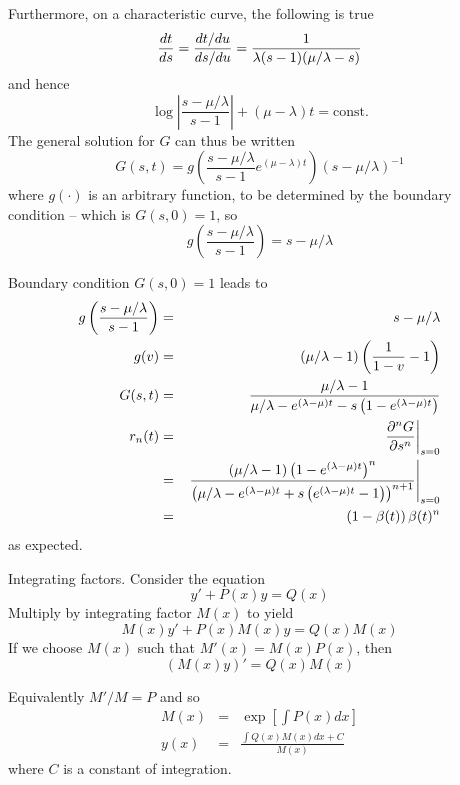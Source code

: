 \documentclass{beamer}
\begin{document}
\begin{frame}{}
Furthermore, on a characteristic curve, the following is true
\[
\frac{d {t}}{d {s}} = \frac{dt/du}{ds/du} = \frac{1}{\lambda(s-1)(\mu/\lambda - s)}
\]
and hence
\[
\log \left| \frac{s - \mu / \lambda}{s - 1} \right| + (\mu - \lambda) t = \mbox{const.}
\]
The general solution for $G$ can thus be written
\[
G(s,t) = g \left( \frac{s - \mu / \lambda}{s - 1} e^{(\mu - \lambda) t} \right) (s - \mu / \lambda)^{-1}
\]
where $g(\cdot)$ is an arbitrary function, to be determined by the boundary condition -- which is $G(s,0)=1$, so
\[
g \left( \frac{s - \mu / \lambda}{s - 1} \right) = s - \mu / \lambda
\]
\end{frame}

\begin{frame}{}
Boundary condition $G(s,0)=1$ leads to
\begin{eqnarray*}
g \left( \frac{s - \mu / \lambda}{s - 1} \right) & = & s - \mu / \lambda \\
g(v) & = & (\mu / \lambda - 1) \left( \frac{1}{1 - v} - 1 \right) \\
G(s,t) & = & \frac{\mu / \lambda - 1}{\mu / \lambda - e^{(\lambda - \mu)t} - s \left( 1 - e^{(\lambda - \mu)t} \right)} \\
r_n(t) & = & \left. \frac{\partial^{n} {G}}{\partial {s}^{n}} \right|_{s=0} \\
& = & \left. \frac{(\mu / \lambda - 1) \left( 1 - e^{(\lambda - \mu)t} \right)^n}{\left( \mu / \lambda - e^{(\lambda - \mu)t} + s \left( e^{(\lambda - \mu)t} - 1 \right) \right)^{n+1}} \right|_{s=0} \\
& = & \left( 1 - \beta(t) \right) \beta(t)^n
\end{eqnarray*}
as expected.
\end{frame}


\begin{frame}{}

Integrating factors.
Consider the equation
\[
y' + P(x)y = Q(x)
\]
Multiply by integrating factor $M(x)$
to yield
\[
M(x)y' + P(x)M(x)y = Q(x)M(x)
\]
If we choose $M(x)$ such that $M'(x) = M(x)P(x)$, then
\[
(M(x)y)' = Q(x)M(x)
\]

Equivalently $M'/M = P$ and so
\begin{eqnarray*}
M(x) & = & \exp \left[ \int P(x) dx \right] \\
y(x) & = & \frac{\int Q(x) M(x) dx + C}{M(x)}
\end{eqnarray*}
where $C$ is a constant of integration.

\end{frame}
\end{document}
